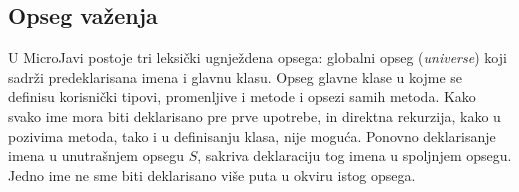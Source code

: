 \subsection*{Opseg važenja}

U MicroJavi postoje tri leksički ugnježdena opsega: globalni opseg (\textit{universe}) koji sadrži predeklarisana imena i glavnu klasu. Opseg glavne klase u kojme se definisu korisnički tipovi, promenljive i metode i opsezi samih metoda. Kako svako ime mora biti deklarisano pre prve upotrebe, in direktna rekurzija, kako u pozivima metoda, tako i u definisanju klasa, nije moguća. Ponovno deklarisanje imena u unutrašnjem opsegu $S$, sakriva deklaraciju tog imena u spoljnjem opsegu. Jedno ime ne sme biti deklarisano više puta u okviru istog opsega.

